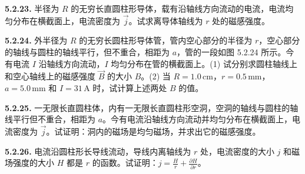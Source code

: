 \begin{center}
\end{center}

\vfill
\newpage

\textbf{5.2.23.} 半径为 $R$ 的无穷长直圆柱形导体，载有沿轴线方向流动的电流，电流均匀分布在横截面上，电流密度为 $\vec{j}$。试求离导体轴线为 $r$ 处的磁感强度。

\vfill
\newpage

\textbf{5.2.24.} 外半径为 $R$ 的无穷长圆柱形导体管，管内空心部分的半径为 $r$，空心部分的轴线与圆柱的轴线平行，但不重合，相距为 $a$，管的一段如图 5.2.24 所示。今有电流 $I$ 沿轴线方向流动，$I$ 均匀分布在管的横截面上。(1) 试分别求圆柱轴线上和空心轴线上的磁感强度 $\vec{B}$ 的大小 $B$。(2) 当 $R = 1.0\,\mathrm{cm}$，$r = 0.5\,\mathrm{mm}$，$a = 5.0\,\mathrm{mm}$ 和 $I = 31\,\mathrm{A}$ 时，试计算上述两处 $B$ 的值。

\begin{center}
\end{center}

\vfill
\newpage

\textbf{5.2.25.} 一无限长直圆柱体，内有一无限长直圆柱形空洞，空洞的轴线与圆柱的轴线平行但不重合，相距为 $a$。今有电流沿轴线方向流动并均匀分布在横截面上，电流密度为 $\vec{j}$。试证明：洞内的磁场是均匀磁场，并求出它的磁感强度。

\vfill
\newpage

\textbf{5.2.26.} 电流沿圆柱形长导线流动，导线内离轴线为 $r$ 处，电流密度的大小 $j$ 和磁场强度的大小 $H$ 都是 $r$ 的函数。试证明：$\displaystyle j = \frac{H}{r} + \frac{\partial H}{\partial r}$。

\vfill
\newpage
